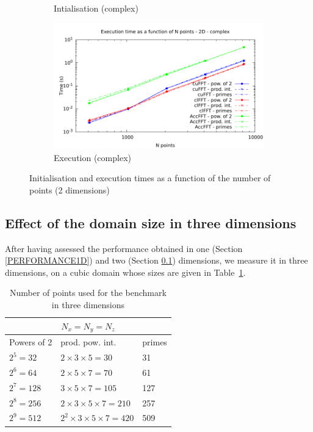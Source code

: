 \documentclass[12pt, a4paper]{article}
\begin{document}
\begin{figure}[H]
\begin{subfigure}{.5\textwidth}
\caption{Intialisation (complex)}
\label{FFT2DCI}
\end{subfigure}%
\begin{subfigure}{.5\textwidth}
\centering
\includegraphics[width=.9\linewidth]{graphs/fft-2d-c-exec.pdf}
\caption{Execution (complex)}
\label{FFT2DCE}
\end{subfigure}
\caption{Initialisation and execution times as a function of the number of points (2 dimensions)}
\label{FFT2D}
\end{figure}


\subsection{Effect of the domain size in three dimensions}\label{PERFORMANCE3D}
After having assessed the performance obtained in one (Section
\ref{PERFORMANCE1D}) and two (Section \ref{PERFORMANCE3D}) dimensions,
we measure it in three dimensions, on a cubic domain whose sizes are
given in Table~\ref{3DSIZES}.

\begin{table}[H]
  \centering
  \captionsetup{width=0.8\linewidth}
\begin{tabular}{|l|l|l|}
  \hline
  \multicolumn{3}{|c|}{$N_x=N_y=N_z$}\\
  \hline
  \hline
Powers of 2 & prod. pow. int. & primes\\ \hline
$2^5 = 32$ & $2\times 3\times 5 =	30$ & 31\\ \hline
$2^6 = 64$ & $2\times 5\times 7 = 70$ & 61\\ \hline
$2^7 = 128$ & $3\times 5\times 7 = 105$ & 127\\ \hline
$2^8 = 256$ & $2\times 3\times 5\times 7 = 210$ & 257\\ \hline
$2^9 = 512$ & $2^2\times 3\times 5\times 7 = 420$ & 509\\ \hline
\end{tabular}
\caption{Number of points used for the benchmark in three dimensions}\label{3DSIZES}
\end{table}
\end{document}

